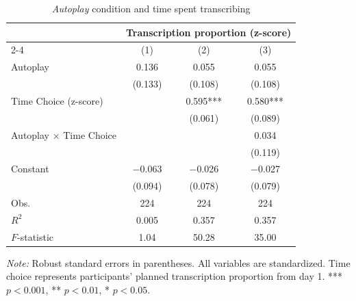 \documentclass[11pt,a4paper,oneside]{article}
\begin{document}
\begin{table}[H]
  \centering
  \caption{\textit{Autoplay} condition and time spent transcribing}
  \begin{threeparttable}
  \begin{tabular*}{\textwidth}{@{\extracolsep{\fill}}lccc}
  \toprule
  & \multicolumn{3}{c}{Transcription proportion (z-score) } \\
  \cmidrule(lr){2-4}
  & (1) & (2) & (3) \\
  \midrule
  Autoplay & 0.136 & 0.055 & 0.055 \\
  & (0.133) & (0.108) & (0.108) \\
  Time Choice (z-score) & & 0.595*** & 0.580*** \\
  & & (0.061) & (0.089) \\
  Autoplay × Time Choice & & & 0.034 \\
  & & & (0.119) \\
  Constant & $-$0.063 & $-$0.026 & $-$0.027 \\
  & (0.094) & (0.078) & (0.079) \\
  \midrule
  Obs. & 224 & 224 & 224 \\
  $R^2$ & 0.005 & 0.357 & 0.357 \\
  $F$-statistic & 1.04 & 50.28 & 35.00 \\
  \bottomrule
  \end{tabular*}
  \begin{tablenotes}[flushleft]
  \footnotesize
  \item[] \textit{Note:} Robust standard errors in parentheses. All variables are standardized. Time choice represents participants' planned transcription proportion from day 1. *** $p<0.001$, ** $p<0.01$, * $p<0.05$.
  \end{tablenotes}
  \end{threeparttable}
  \label{tab:typing_regressions_full}
\end{table}
\end{document}

